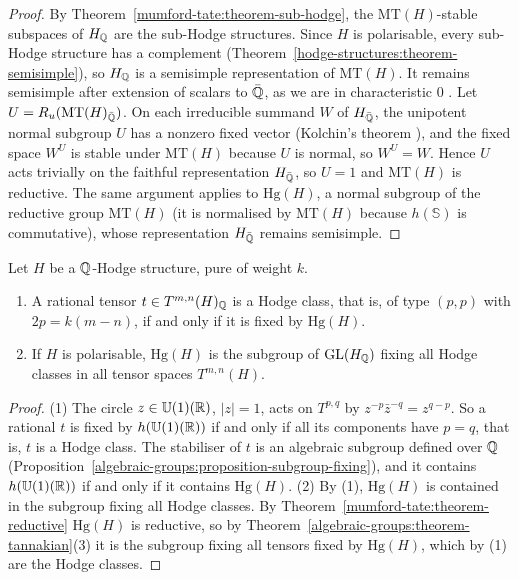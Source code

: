 \begin{proof}
By Theorem~\ref{mumford-tate:theorem-sub-hodge}, the $\mathrm{MT}(H)$-stable subspaces of $H_{\mathbb{Q}}$ are the sub-Hodge structures. Since $H$ is polarisable, every sub-Hodge structure has a complement
(Theorem~\ref{hodge-structures:theorem-semisimple}), so $H_{\mathbb{Q}}$ is a semisimple representation of $\mathrm{MT}(H)$. It remains semisimple after extension of scalars to $\bar{\mathbb{Q}}$, as we are in
characteristic $0$ \cite{milne-algebraic-groups}. Let $U = R_u(\mathrm{MT}(H)_{\bar{\mathbb{Q}}})$. On each irreducible summand $W$ of $H_{\bar{\mathbb{Q}}}$, the unipotent normal subgroup $U$ has a nonzero fixed
vector (Kolchin's theorem \cite{borel-lag}), and the fixed space $W^U$ is stable under $\mathrm{MT}(H)$ because $U$ is normal, so $W^U = W$. Hence $U$ acts trivially on the faithful
representation $H_{\bar{\mathbb{Q}}}$, so $U = 1$ and $\mathrm{MT}(H)$ is reductive. The same argument applies to $\mathrm{Hg}(H)$, a normal subgroup of the reductive group $\mathrm{MT}(H)$ (it is normalised by
$\mathrm{MT}(H)$ because $h(\mathbb{S})$ is commutative), whose representation $H_{\bar{\mathbb{Q}}}$ remains semisimple.
\end{proof}

\begin{theorem}\label{mumford-tate:theorem-hodge-classes-invariants}
Let $H$ be a $\mathbb{Q}$-Hodge structure, pure of weight $k$.
\begin{enumerate}
\item A rational tensor $t \in T^{m,n}(H)_{\mathbb{Q}}$ is a Hodge class, that is, of type $(p, p)$ with $2p = k(m - n)$, if and only if it is fixed by $\mathrm{Hg}(H)$.
\item If $H$ is polarisable, $\mathrm{Hg}(H)$ is the subgroup of $\mathrm{GL}(H_{\mathbb{Q}})$ fixing all Hodge classes in all tensor spaces $T^{m,n}(H)$.
\end{enumerate}
\end{theorem}

\begin{proof}
(1) The circle $z \in \mathbb{U}(1)(\mathbb{R})$, $|z| = 1$, acts on $T^{p,q}$ by $z^{-p}\bar z^{-q} = z^{q-p}$. So a rational $t$ is fixed by $h(\mathbb{U}(1)(\mathbb{R}))$ if and only if all its components have
$p = q$, that is, $t$ is a Hodge class. The stabiliser of $t$ is an algebraic subgroup defined over $\mathbb{Q}$ (Proposition~\ref{algebraic-groups:proposition-subgroup-fixing}), and it contains
$h(\mathbb{U}(1)(\mathbb{R}))$ if and only if it contains $\mathrm{Hg}(H)$. (2) By (1), $\mathrm{Hg}(H)$ is contained in the subgroup fixing all Hodge classes. By Theorem~\ref{mumford-tate:theorem-reductive}
$\mathrm{Hg}(H)$ is reductive, so by Theorem~\ref{algebraic-groups:theorem-tannakian}(3) it is the subgroup fixing all tensors fixed by $\mathrm{Hg}(H)$, which by (1) are the Hodge classes.
\end{proof}

